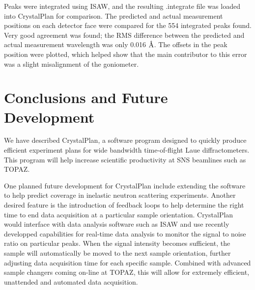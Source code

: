 \documentclass[final]{iucr}              %
\newcommand{\ang}{$\mathrm{\AA} $}
\begin{document}
Peaks were integrated using ISAW, and the resulting .integrate file was loaded
into CrystalPlan for comparison. The predicted and actual measurement
positions on each detector face were compared for the 554 integrated peaks
found. Very good agreement was found; the
RMS difference between the predicted and actual measurement wavelength was only
0.016 \ang. The offsets in the peak position were plotted, which
helped show that the main contributor to this error was a slight misalignment of
the goniometer.





\section{Conclusions and Future Development}

We have described CrystalPlan, a software program designed to quickly produce
efficient experiment plans for wide bandwidth time-of-flight Laue
diffractometers. This program will help increase scientific productivity at SNS
beamlines such as TOPAZ.

One planned future development for CrystalPlan include extending the software
to help predict coverage in inelastic neutron scattering experiments. Another
desired feature is the introduction of feedback loops to help determine the
right time to end data acquisition at a particular sample orientation.
CrystalPlan would interface with data analysis software such as ISAW and use
recently developped capabilities for real-time data analysis to monitor
the  signal to noise ratio on particular peaks. When the signal intensity
becomes sufficient, the sample will automatically be moved to the next sample
orientation, further adjusting data acquisition time for each specific sample.
Combined with advanced sample changers coming on-line at TOPAZ, this will allow
for extremely efficient, unattended and automated data acquisition.
\end{document}
